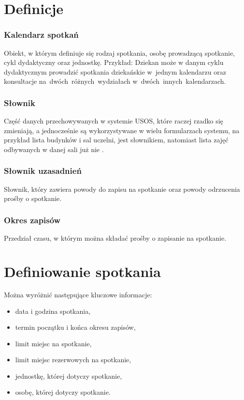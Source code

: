 \documentclass[licencjacka]{pracamgr}
\begin{document}
\section{Definicje}
\subsubsection{Kalendarz spotkań}
Obiekt, w którym definiuje się rodzaj spotkania, osobę prowadzącą spotkanie, cykl dydaktyczny oraz jednostkę. Przykład: Dziekan może w danym cyklu dydaktycznym prowadzić spotkania dziekańskie w~jednym kalendarzu oraz konsultacje na~dwóch~różnych~wydziałach w~dwóch~innych~kalendarzach.

\subsubsection{Słownik}
Część danych  przechowywanych  w  systemie  USOS, które  raczej  rzadko się zmieniają, a  jednocześnie są wykorzystywane w wielu formularzach systemu, na przykład lista budynków i sal uczelni, jest słownikiem, natomiast lista zajęć odbywanych w danej sali już nie \cite{prz}.

\subsubsection{Słownik uzasadnień}
Słownik, który zawiera powody do zapisu na spotkanie oraz powody odrzucenia prośby o spotkanie.

\subsubsection{Okres zapisów}
Przedział czasu, w którym można składać prośby o zapisanie na spotkanie.


\section{Definiowanie spotkania}
Można wyróżnić następujące kluczowe informacje:

\begin{itemize}
\setlength\itemsep{0,05em}
    \item data i godzina spotkania,
    \item termin początku i końca okresu zapisów,
    \item limit miejsc na spotkanie,
    \item limit miejsc rezerwowych na spotkanie,
    \item jednostkę, której dotyczy spotkanie,
    \item osobę, której dotyczy spotkanie.
\end{itemize}
\end{document}
